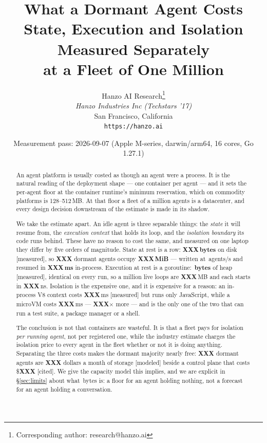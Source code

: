 \documentclass[11pt]{article}
\title{What a Dormant Agent Costs\\[0.3em]
{\large State, Execution and Isolation Measured Separately\\
at a Fleet of One Million}}
\author{
    Hanzo AI Research\thanks{Corresponding author: research@hanzo.ai} \\
    \textit{Hanzo Industries Inc (Techstars '17)} \\
    San Francisco, California \\
    \texttt{https://hanzo.ai}
}
\date{Measurement pass: 2026-09-07 (Apple M-series, darwin/arm64, 16 cores, Go 1.27.1)}
\newcommand{\meas}{\textcolor{blue!60!black}{\small[measured]}}
\newcommand{\modeled}{\textcolor{orange!70!black}{\small[modeled]}}
\newcommand{\cited}{\textcolor{purple!70!black}{\small[cited]}}
\newcommand{\ph}{\textbf{XXX}}
\newcommand{\rFleetAgents}{\ph}   \newcommand{\rFleetRecord}{\ph}
\newcommand{\rFleetDisk}{\ph}     \newcommand{\rFleetPer}{\ph}
\newcommand{\rFleetResume}{\ph}   \newcommand{\rFleetResumeCold}{\ph}
\newcommand{\rGoSpawn}{\ph}       \newcommand{\rGoSpawnLo}{\ph}
\newcommand{\rGoHeap}{\ph}        \newcommand{\rGoWake}{\ph}
\newcommand{\rVeight}{\ph}        \newcommand{\rVeightP}{\ph}
\newcommand{\rVm}{\ph}            \newcommand{\rVmP}{\ph}
\newcommand{\rVmRatio}{\ph}       \newcommand{\rPlaneCost}{\ph}
\newcommand{\rFleetStorage}{\ph}
\begin{document}
\hanzocoverpage
\maketitle

\begin{abstract}
An agent platform is usually costed as though an agent were a process. It is the
natural reading of the deployment shape --- one container per agent --- and it
sets the per-agent floor at the container runtime's minimum reservation, which
on commodity platforms is 128--512\,MB\@. At that floor a fleet of a million
agents is a datacenter, and every design decision downstream of the estimate is
made in its shadow.

We take the estimate apart. An idle agent is three separable things: the
\emph{state} it will resume from, the \emph{execution context} that holds its
loop, and the \emph{isolation boundary} its code runs behind. These have no
reason to cost the same, and measured on one laptop they differ by five orders
of magnitude. State at rest is a row: \textbf{\rFleetPer{}\,bytes} on disk
\meas{}, so \rFleetAgents{} dormant agents occupy \textbf{\rFleetDisk{}\,MiB}
--- written at \rFleetRate{}\,agents/s and resumed in
\textbf{\rFleetResume{}\,ms} in-process. Execution at rest is a goroutine:
\textbf{\rGoPer{}\,bytes} of heap \meas{}, identical on every run, so a million
live loops are \rGoHeap{}\,MB and each starts in \rGoSpawn{}\,ns. Isolation is
the expensive one, and it is expensive for a reason: an in-process V8 context
costs \rVeight{}\,ms \meas{} but runs only JavaScript, while a microVM
costs \rVm{}\,ms --- \rVmRatio{}$\times$ more --- and is the only one of the
two that can run a test suite, a package manager or a shell.

The conclusion is not that containers are wasteful. It is that a fleet pays for
isolation \emph{per running agent}, not per registered one, while the industry
estimate charges the isolation price to every agent in the fleet whether or not
it is doing anything. Separating the three costs makes the dormant majority
nearly free: \rFleetAgents{} dormant agents are \rFleetStorage{} dollars a month
of storage \modeled{} beside a control plane that costs \$\rPlaneCost{}
\cited{}. We give the capacity model this implies, and we are explicit in
\S\ref{sec:limits} about what \rGoPer{}\,bytes is: a floor for an agent holding
nothing, not a forecast for an agent holding a conversation.
\end{abstract}










\end{document}
